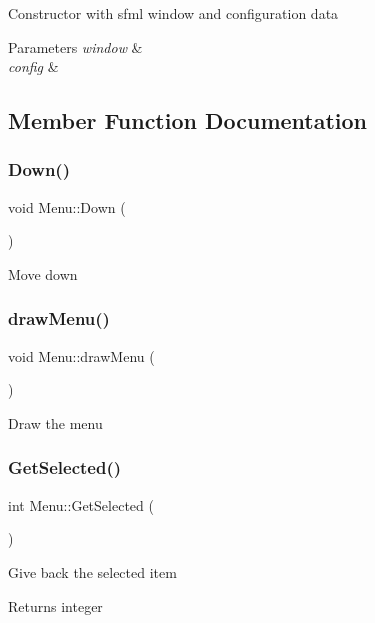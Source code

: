 Constructor with sfml window and configuration data 
\begin{DoxyParams}{Parameters}
{\em window} & \\
\hline
{\em config} & \\
\hline
\end{DoxyParams}


\subsection{Member Function Documentation}
\mbox{\label{classMenu_a2963765d4666e9f4dea6b3e508a020a9}} 
\subsubsection{\texorpdfstring{Down()}{Down()}}
{\footnotesize\ttfamily void Menu\+::\+Down (\begin{DoxyParamCaption}{ }\end{DoxyParamCaption})}

Move down \mbox{\label{classMenu_a9df102abcebc51e69c4728dc3d3c3be0}} 
\subsubsection{\texorpdfstring{draw\+Menu()}{drawMenu()}}
{\footnotesize\ttfamily void Menu\+::draw\+Menu (\begin{DoxyParamCaption}{ }\end{DoxyParamCaption})}

Draw the menu \mbox{\label{classMenu_a30033d60fd0e4dedc92fb298ecfda7f8}} 
\subsubsection{\texorpdfstring{Get\+Selected()}{GetSelected()}}
{\footnotesize\ttfamily int Menu\+::\+Get\+Selected (\begin{DoxyParamCaption}{ }\end{DoxyParamCaption})}

Give back the selected item \begin{DoxyReturn}{Returns}
integer 
\end{DoxyReturn}
\mbox{\label{classMenu_a7477c08823e9322963d9cac0b326d87f}} 
